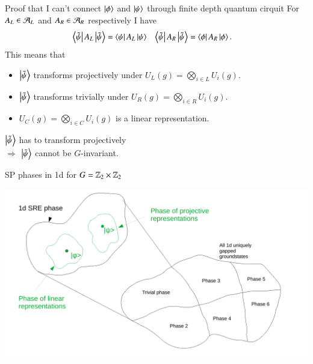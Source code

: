 \documentclass{beamer}
\begin{document}
\begin{frame}{Proof that I can't connect $\ket{\phi}$ and $\ket{\psi}$ through finite depth quantum cirquit}
	For $A_L\in\AA_L$ and $A_R\in\AA_R$ respectively I have
	\begin{align}
		\bra{\tilde\psi}A_L\ket{\tilde{\psi}}&=\bra{\psi}A_L\ket{\psi}&\bra{\tilde\psi}A_R\ket{\tilde{\psi}}&=\bra{\phi}A_R\ket{\phi}.
	\end{align}
	\pause
	This means that
	\begin{itemize}
		\item $\ket{\tilde{\psi}}$ transforms projectively under $U_L(g)=\bigotimes_{i \in L}U_i(g)$.
		\item $\ket{\tilde{\psi}}$ transforms trivially under $U_R(g)=\bigotimes_{i \in R}U_i(g)$.
		\item <3->$U_C(g)=\bigotimes_{i\in C}U_i(g)$ is a linear representation.
	\end{itemize}
	\pause
	\pause
	$\ket{\tilde{\psi}}$ has to transform projectively\\
	\pause
	$\Rightarrow$ $\ket{\tilde{\psi}}$ cannot be $G$-invariant.
\end{frame}

\begin{frame}{SP phases in 1d for $G=\ZZ_2\times \ZZ_2$}
	\begin{center}
		\includegraphics[width=\linewidth]{Figures/SPT_Phases_1d.pdf}
	\end{center}
\end{frame}
\end{document}
